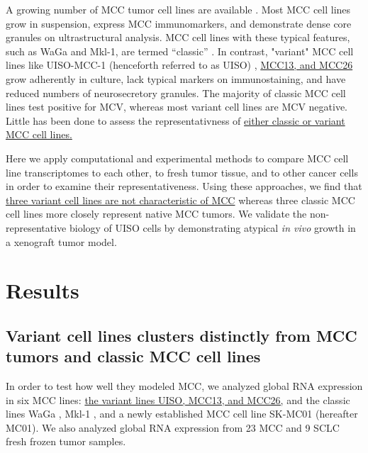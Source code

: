 \documentclass[10pt]{article}
\begin{document}
A growing number of MCC tumor cell lines are available \citep{Krasagakis2001Growth,Leonard1993Characterization,Rosen1987Establishment,Leonard1995Characterisation,Moll1994Establishment,Ronan1993Merkel}.
Most MCC cell lines grow in suspension, express MCC immunomarkers, and demonstrate dense core granules on ultrastructural analysis.
MCC cell lines with these typical features, such as WaGa and Mkl-1, are termed ``classic'' \citep{Ronan1993Merkel,Leonard1993Characterization,VanGele2004Geneexpression}.
In contrast, "variant" MCC cell lines like UISO-MCC-1 (henceforth referred to as UISO) \citep{Ronan1993Merkel}, \uline{MCC13, and MCC26} \citep{Leonard1995Characterisation} grow adherently in culture, lack typical markers on immunostaining, and have reduced numbers of neurosecretory granules.
The majority of classic MCC cell lines test positive for MCV, whereas most variant cell lines are MCV negative. 
Little has been done to assess the representativness of \uline{either classic or variant MCC cell lines.}

Here we apply computational and experimental methods to compare MCC cell line transcriptomes to each other, to fresh tumor tissue, and to other cancer cells in order to examine their representativeness.
Using these approaches, we find that \uline{three variant cell lines are not characteristic of MCC} whereas three classic MCC cell lines more closely represent native MCC tumors. 
We validate the non-representative biology of UISO cells by demonstrating atypical \emph{in vivo} growth in a xenograft tumor model. 

\section*{Results}

\subsection*{Variant cell lines clusters distinctly from MCC tumors and classic MCC cell lines}
In order to test how well they modeled MCC, we analyzed global RNA expression in six MCC lines: \uline{the variant lines UISO, MCC13, and MCC26,} and the classic lines WaGa \citep{Houben2010Merkel}, Mkl-1 \citep{Rosen1987Establishment}, and a newly established MCC cell line SK-MC01 (hereafter MC01).
We also analyzed global RNA expression from 23 MCC and 9 SCLC fresh frozen tumor samples.
\end{document}
